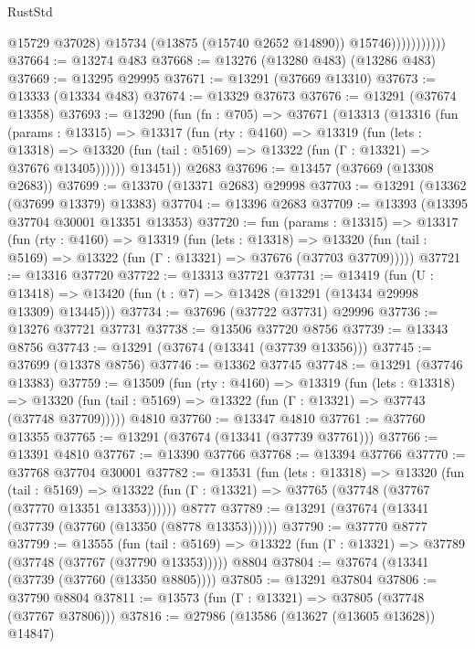 \begin{lexlean}{RustStd}
\begin{coremodule}
                            @15729
                            @37028)
                          @15734
                          (@13875 (@15740 @2652 @14890))
                          @15746)))))))))))
@37664 := @13274 @483
@37668 := @13276 (@13280 @483) (@13286 @483)
@37669 := @13295 @29995
@37671 := @13291 (@37669 @13310)
@37673 := @13333 (@13334 @483)
@37674 := @13329 @37673
@37676 := @13291 (@37674 @13358)
@37693 := @13290
    (fun (fn : @705) =>
    @37671
      (@13313
        (@13316
          (fun (params : @13315) =>
          @13317
            (fun (rty : @4160) =>
            @13319
              (fun (lets : @13318) =>
              @13320 (fun (tail : @5169) => @13322 (fun (Γ : @13321) => @37676 @13405))))))
        @13451))
    @2683
@37696 := @13457 (@37669 (@13308 @2683))
@37699 := @13370 (@13371 @2683) @29998
@37703 := @13291 (@13362 (@37699 @13379) @13383)
@37704 := @13396 @2683
@37709 := @13393 (@13395 @37704 @30001 @13351 @13353)
@37720 := fun (params : @13315) =>
  @13317
    (fun (rty : @4160) =>
    @13319
      (fun (lets : @13318) =>
      @13320 (fun (tail : @5169) => @13322 (fun (Γ : @13321) => @37676 (@37703 @37709)))))
@37721 := @13316 @37720
@37722 := @13313 @37721
@37731 := @13419
    (fun (U : @13418) => @13420 (fun (t : @7) => @13428 (@13291 (@13434 @29998 @13309) @13445)))
@37734 := @37696 (@37722 @37731) @29996
@37736 := @13276 @37721 @37731
@37738 := @13506 @37720 @8756
@37739 := @13343 @8756
@37743 := @13291 (@37674 (@13341 (@37739 @13356)))
@37745 := @37699 (@13378 @8756)
@37746 := @13362 @37745
@37748 := @13291 (@37746 @13383)
@37759 := @13509
    (fun (rty : @4160) =>
    @13319
      (fun (lets : @13318) =>
      @13320 (fun (tail : @5169) => @13322 (fun (Γ : @13321) => @37743 (@37748 @37709)))))
    @4810
@37760 := @13347 @4810
@37761 := @37760 @13355
@37765 := @13291 (@37674 (@13341 (@37739 @37761)))
@37766 := @13391 @4810
@37767 := @13390 @37766
@37768 := @13394 @37766
@37770 := @37768 @37704 @30001
@37782 := @13531
    (fun (lets : @13318) =>
    @13320
      (fun (tail : @5169) =>
      @13322 (fun (Γ : @13321) => @37765 (@37748 (@37767 (@37770 @13351 @13353))))))
    @8777
@37789 := @13291 (@37674 (@13341 (@37739 (@37760 (@13350 (@8778 @13353))))))
@37790 := @37770 @8777
@37799 := @13555
    (fun (tail : @5169) => @13322 (fun (Γ : @13321) => @37789 (@37748 (@37767 (@37790 @13353)))))
    @8804
@37804 := @37674 (@13341 (@37739 (@37760 (@13350 @8805))))
@37805 := @13291 @37804
@37806 := @37790 @8804
@37811 := @13573 (fun (Γ : @13321) => @37805 (@37748 (@37767 @37806)))
@37816 := @27986 (@13586 (@13627 (@13605 @13628)) @14847)

\end{coremodule}
\end{lexlean}

